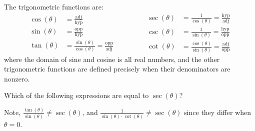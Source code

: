 \documentclass{ximera}
\begin{document}
\begin{definition}
  The trigonometric functions are:
  \[
  \begin{aligned}
  \cos(\theta) &= \frac{\text{adj}}{\text{hyp}}\\
  \sin(\theta) &= \frac{\text{opp}}{\text{hyp}}\\  
  \tan(\theta) &= \frac{\sin(\theta)}{\cos(\theta)}=\frac{\text{opp}}{\text{adj}}\qquad
  \end{aligned}
  \qquad
  \begin{aligned}
  \sec(\theta) &= \frac{1}{\cos(\theta)}=\frac{\text{hyp}}{\text{adj}}\\
  \csc(\theta) &= \frac{1}{\sin(\theta)}=\frac{\text{hyp}}{\text{opp}}\\
  \cot(\theta) &= \frac{\cos(\theta)}{\sin(\theta)} =\frac{\text{adj}}{\text{opp}}   
  \end{aligned}
  \]
  where the domain of sine and cosine is all real numbers, and the
  other trigonometric functions are defined precisely when their
  denominators are nonzero.
\end{definition}

\begin{question}
  Which of the following expressions are equal to $\sec(\theta)$?
  \begin{selectAll}
    \choice{$\frac{\tan(\theta)}{\sin(\theta)}$}
  \end{selectAll}
  \begin{feedback}
    Note, $\frac{\tan(\theta)}{\sin(\theta)}\ne \sec(\theta)$, and
    $\frac{1}{\sin(\theta)\cdot\cot(\theta)}\ne \sec(\theta)$ since
    they differ when $\theta =0$.
  \end{feedback}
\end{question}
\end{document}
